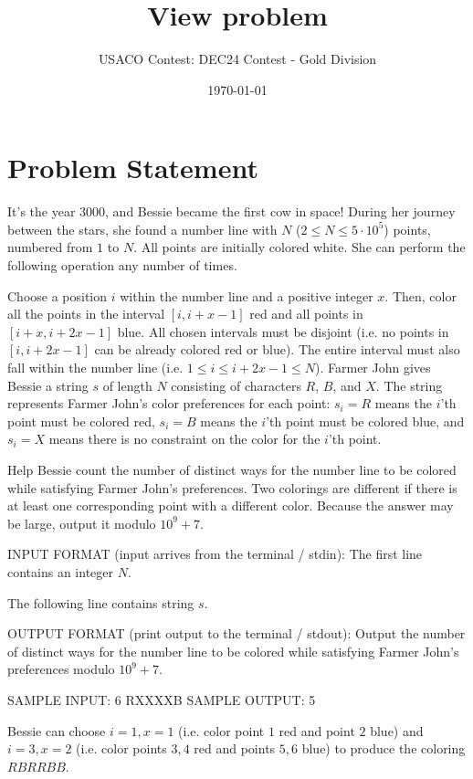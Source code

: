 \documentclass[12pt]{article}
\title{View problem}
\author{USACO Contest: DEC24 Contest - Gold Division}
\date{\today}
\begin{document}
\maketitle

\section*{Problem Statement}


It's the year $3000$, and Bessie became the first cow in space! During her
journey between the stars, she found a number line with $N$
($2 \leq N \leq 5 \cdot 10^5$) points, numbered from $1$ to $N$. All points are
initially colored white. She can perform the following operation any number of
times.

Choose a position $i$ within the number line and a positive integer $x$.
Then, color all the points in the interval $[i, i + x - 1]$ red and all points
in $[i + x, i + 2x - 1]$ blue. All chosen intervals must be disjoint
(i.e. no points in $[i, i + 2x - 1]$ can be already colored red or blue). The
entire interval must also fall within the number line (i.e.
$1 \leq i \leq i + 2x - 1 \leq N$).
Farmer John gives Bessie a string $s$ of length $N$ consisting of characters
$R$, $B$, and $X$. The string represents Farmer John's color preferences for
each point: $s_i=R$ means the $i$'th point must be colored red, $s_i = B$ means
the $i$'th point must be colored blue, and $s_i = X$ means there is no
constraint on the color for the $i$'th point.

Help Bessie count the number of distinct ways for the number line to be colored
while satisfying Farmer John's preferences. Two colorings are different if there
is at least one corresponding point with a different color. Because the answer
may be large, output it modulo $10^9+7$. 

INPUT FORMAT (input arrives from the terminal / stdin):
The first line contains an integer $N$.

The following line contains string $s$.

OUTPUT FORMAT (print output to the terminal / stdout):
Output the number of distinct ways for the number line to be colored while
satisfying Farmer John's preferences modulo
$10^9+7$.

SAMPLE INPUT:
6
RXXXXB
SAMPLE OUTPUT: 
5

Bessie can choose $i=1,x=1$ (i.e. color point $1$ red and point $2$ blue) and
$i=3,x=2$ (i.e. color points $3,4$ red and points $5,6$ blue) to produce the
coloring $RBRRBB$. 
\end{document}
